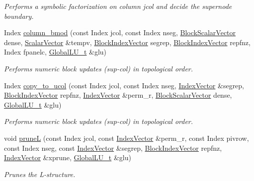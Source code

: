 \begin{DoxyCompactItemize}
\begin{DoxyCompactList}\small\item\em Performs a symbolic factorization on column jcol and decide the supernode boundary. \end{DoxyCompactList}\item 
Index \mbox{\hyperlink{class_eigen_1_1internal_1_1_sparse_l_u_impl_ae34275602cf12560edfcaf7cd5cbe932}{column\+\_\+bmod}} (const Index jcol, const Index nseg, \mbox{\hyperlink{class_eigen_1_1_ref}{Block\+Scalar\+Vector}} dense, \mbox{\hyperlink{class_eigen_1_1_matrix}{Scalar\+Vector}} \&tempv, \mbox{\hyperlink{class_eigen_1_1_ref}{Block\+Index\+Vector}} segrep, \mbox{\hyperlink{class_eigen_1_1_ref}{Block\+Index\+Vector}} repfnz, Index fpanelc, \mbox{\hyperlink{struct_eigen_1_1internal_1_1_l_u___global_l_u__t}{Global\+L\+U\+\_\+t}} \&glu)
\begin{DoxyCompactList}\small\item\em Performs numeric block updates (sup-\/col) in topological order. \end{DoxyCompactList}\item 
Index \mbox{\hyperlink{class_eigen_1_1internal_1_1_sparse_l_u_impl_ae4867ed1d5f104f9245411c356416a21}{copy\+\_\+to\+\_\+ucol}} (const Index jcol, const Index nseg, \mbox{\hyperlink{class_eigen_1_1_matrix}{Index\+Vector}} \&segrep, \mbox{\hyperlink{class_eigen_1_1_ref}{Block\+Index\+Vector}} repfnz, \mbox{\hyperlink{class_eigen_1_1_matrix}{Index\+Vector}} \&perm\+\_\+r, \mbox{\hyperlink{class_eigen_1_1_ref}{Block\+Scalar\+Vector}} dense, \mbox{\hyperlink{struct_eigen_1_1internal_1_1_l_u___global_l_u__t}{Global\+L\+U\+\_\+t}} \&glu)
\begin{DoxyCompactList}\small\item\em Performs numeric block updates (sup-\/col) in topological order. \end{DoxyCompactList}\item 
void \mbox{\hyperlink{class_eigen_1_1internal_1_1_sparse_l_u_impl_a350464d1c83182fbd7da8a5a74bdfde8}{pruneL}} (const Index jcol, const \mbox{\hyperlink{class_eigen_1_1_matrix}{Index\+Vector}} \&perm\+\_\+r, const Index pivrow, const Index nseg, const \mbox{\hyperlink{class_eigen_1_1_matrix}{Index\+Vector}} \&segrep, \mbox{\hyperlink{class_eigen_1_1_ref}{Block\+Index\+Vector}} repfnz, \mbox{\hyperlink{class_eigen_1_1_matrix}{Index\+Vector}} \&xprune, \mbox{\hyperlink{struct_eigen_1_1internal_1_1_l_u___global_l_u__t}{Global\+L\+U\+\_\+t}} \&glu)
\begin{DoxyCompactList}\small\item\em Prunes the L-\/structure. \end{DoxyCompactList}\item 

\end{DoxyCompactItemize}
